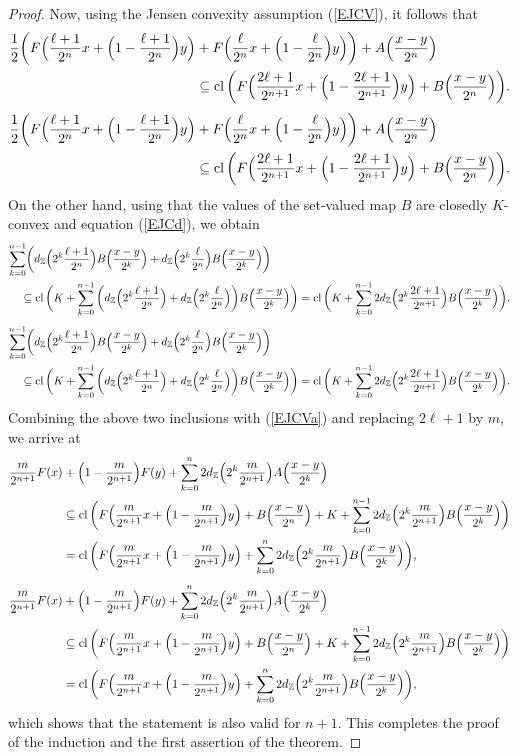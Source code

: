 \documentclass[12pt,reqno]{amsart}
\newcommand{\Z}{\mathbb{Z}}
\newcommand{\cl}{\mathop{\hbox{\rm cl}}\nolimits}
\theoremstyle{definition}
\def\eq#1{{\rm(\ref{E#1})}}
\def\Eq#1#2{\ifthenelse{\equal{#1}{*}}
  {\begin{equation*}\begin{aligned}[]#2\end{aligned}\end{equation*}}
  {\begin{equation}\begin{aligned}[]\label{E#1}#2\end{aligned}\end{equation}}}
\begin{document}
\begin{proof}
{}
Now, using the Jensen convexity assumption \eq{JCV}, it follows that
\Eq{*}{
  \frac12\bigg(F\Big(\frac{\ell+1}{2^{n}}x+\Big(1-\frac{\ell+1}{2^{n}}\Big)y\Big)
     &+F\Big(\frac{\ell}{2^{n}}x+\Big(1-\frac{\ell}{2^{n}}\Big)y\Big)\bigg)
     +A\Big(\frac{x-y}{2^n}\Big) \\
 &\subseteq \cl\bigg(F\Big(\frac{2\ell+1}{2^{n+1}}x+\Big(1-\frac{2\ell+1}{2^{n+1}}\Big)y\Big)
     +B\Big(\frac{x-y}{2^n}\Big)\bigg).
}
On the other hand, using that the values of the set-valued map $B$ are closedly $K$-convex and 
equation \eq{JCd}, we obtain
\Eq{*}{
 \sum_{k=0}^{n-1}&\bigg(d_\Z\Big(2^k\frac{\ell+1}{2^{n}}\Big)B\Big(\frac{x-y}{2^k}\Big)
      +d_\Z\Big(2^k\frac{\ell}{2^{n}}\Big) B\Big(\frac{x-y}{2^k}\Big)\bigg) \\
  &\!\!\!\subseteq \cl\bigg(K+\sum_{k=0}^{n-1}\bigg(d_\Z\Big(2^k\frac{\ell+1}{2^{n}}\Big)
      +d_\Z\Big(2^k\frac{\ell}{2^{n}}\Big)\bigg) B\Big(\frac{x-y}{2^k}\Big)\bigg)
  = \cl\bigg(K+\sum_{k=0}^{n-1}2d_\Z\Big(2^k\frac{2\ell+1}{2^{n+1}}\Big)B\Big(\frac{x-y}{2^k}\Big)\bigg).
}
Combining the above two inclusions with \eq{JCVa} and replacing $2\ell+1$ by $m$, we arrive at
\Eq{*}{
  \frac{m}{2^{n+1}}F(x)&+\Big(1-\frac{m}{2^{n+1}}\Big)F(y)
   + \sum_{k=0}^{n}2 d_{\Z}\Big(2^k \frac{m}{2^{n+1}}\Big)A\Big(\frac{x-y}{2^k}\Big) \\
  &\subseteq   \cl\bigg(F\Big(\frac{m}{2^{n+1}}x+\Big(1-\frac{m}{2^{n+1}}\Big)y\Big)
     +B\Big(\frac{x-y}{2^n}\Big) + K
  +\sum_{k=0}^{n-1}2d_\Z\Big(2^k\frac{m}{2^{n+1}}\Big)B\Big(\frac{x-y}{2^k}\Big)\bigg)\\
  &= \cl\bigg(F\Big(\frac{m}{2^{n+1}}x+\Big(1-\frac{m}{2^{n+1}}\Big)y\Big)
  +\sum_{k=0}^{n}2d_\Z\Big(2^k\frac{m}{2^{n+1}}\Big)B\Big(\frac{x-y}{2^k}\Big)\bigg),
}
which shows that the statement is also valid for $n+1$. This completes the proof of the induction and the first 
assertion of the theorem.


\end{proof}
\end{document}
